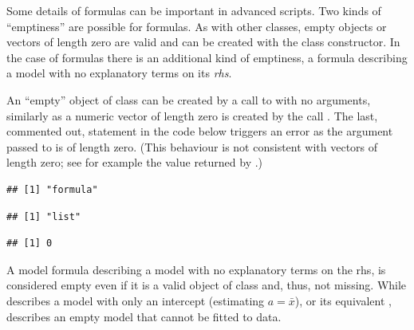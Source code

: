 \documentclass[krantz2]{krantz}\usepackage{knitr}
\begin{document}
\begin{explainbox}
Some details of \Rlang formulas can be important in advanced scripts. Two kinds of ``emptiness'' are possible for formulas. As with other classes, empty objects or vectors of length zero are valid and can be created with the class constructor. In the case of formulas there is an additional kind of emptiness, a formula describing a model with no explanatory terms on its \emph{rhs}.

An ``empty'' object of class  can be created by a call to  with no arguments, similarly as a numeric vector of length zero is created by the call . The last, commented out, statement in the code below triggers an error as the argument passed to  is of length zero. (This behaviour is not consistent with  vectors of length zero; see for example the value returned by .)

\begin{knitrout}\footnotesize
{}\color{fgcolor}\begin{kframe}
\begin{alltt}
\hlstd{(}\hlstd{())}
\end{alltt}
\begin{verbatim}
## [1] "formula"
\end{verbatim}
\begin{alltt}
\hlstd{(}\hlstd{())}
\end{alltt}
\begin{verbatim}
## [1] "list"
\end{verbatim}
\begin{alltt}
\hlstd{(}\hlstd{())}
\end{alltt}
\begin{verbatim}
## [1] 0
\end{verbatim}
\begin{alltt}
\end{alltt}
\end{kframe}
\end{knitrout}

A model formula describing a model with no explanatory terms on the rhs, is considered empty even if it is a valid object of class  and, thus, not missing. While  describes a model with only an intercept (estimating $a = \bar{x}$),  or its equivalent , describes an empty model that cannot be fitted to data.


\end{explainbox}
\end{document}
